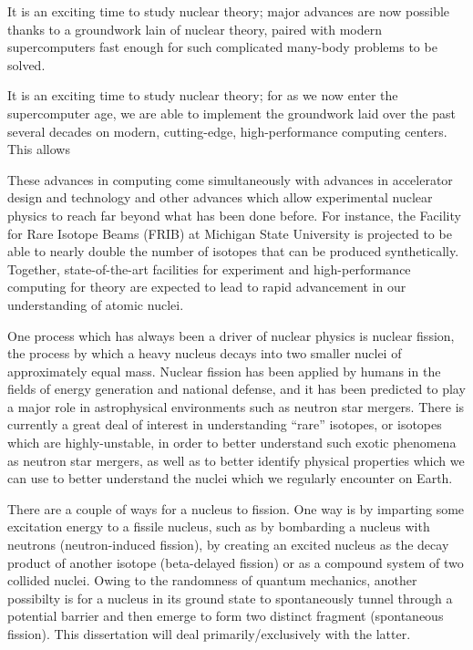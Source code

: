 It is an exciting time to study nuclear theory; major advances are now possible thanks to a groundwork lain of nuclear theory, paired with modern supercomputers fast enough for such complicated many-body problems to be solved.

It is an exciting time to study nuclear theory; for as we now enter the supercomputer age, we are able to implement the groundwork laid over the past several decades on modern, cutting-edge, high-performance computing centers. This allows 

These advances in computing come simultaneously with advances in accelerator design and technology and other advances which allow experimental nuclear physics to reach far beyond what has been done before. For instance, the Facility for Rare Isotope Beams (FRIB) at Michigan State University is projected to be able to nearly double the number of isotopes that can be produced synthetically. Together, state-of-the-art facilities for experiment and high-performance computing for theory are expected to lead to rapid advancement in our understanding of atomic nuclei.

One process which has always been a driver of nuclear physics is nuclear fission, the process by which a heavy nucleus decays into two smaller nuclei of approximately equal mass. Nuclear fission has been applied by humans in the fields of energy generation and national defense, and it has been predicted to play a major role in astrophysical environments such as neutron star mergers. There is currently a great deal of interest in understanding ``rare'' isotopes, or isotopes which are highly-unstable, in order to better understand such exotic phenomena as neutron star mergers, as well as to better identify physical properties which we can use to better understand the nuclei which we regularly encounter on Earth.

There are  a couple of ways for a nucleus to fission. One way is by imparting some excitation energy to a fissile nucleus, such as by bombarding a nucleus with neutrons (neutron-induced fission), by creating an excited nucleus as the decay product of another isotope (beta-delayed fission) or as a compound system of two collided nuclei. Owing to the randomness of quantum mechanics, another possibilty is for a nucleus in its ground state to spontaneously tunnel through a potential barrier and then emerge to form two distinct fragment (spontaneous fission). This dissertation will deal primarily/exclusively with the latter.

